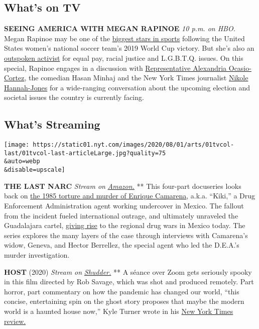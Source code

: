 \hypertarget{whats-on-tv}{%
\subsection{What's on TV}\label{whats-on-tv}}

\textbf{SEEING AMERICA WITH MEGAN RAPINOE} \emph{10 p.m. on HBO.} Megan
Rapinoe may be one of the
\href{https://www.nytimes.com/2019/12/18/sports/year-of-victory-advocacy.html}{biggest
stars in sports} following the United States women's national soccer
team's 2019 World Cup victory. But she's also an
\href{https://www.nytimes.com/interactive/2019/07/29/magazine/megan-rapinoe-sports-politics.html}{outspoken
activist} for equal pay, racial justice and L.G.B.T.Q. issues. On this
special, Rapinoe engages in a discussion with
\href{https://www.nytimes.com/2020/07/23/us/alexandria-ocasio-cortez-sexism-congress.html}{Representative
Alexandria Ocasio-Cortez}, the comedian Hasan Minhaj and the New York
Times journalist
\href{https://www.nytimes.com/by/nikole-hannah-jones}{Nikole
Hannah-Jones} for a wide-ranging conversation about the upcoming
election and societal issues the country is currently facing.

\hypertarget{whats-streaming}{%
\subsection{What's Streaming}\label{whats-streaming}}

\texttt{[image: https://static01.nyt.com/images/2020/08/01/arts/01tvcol-last/01tvcol-last-articleLarge.jpg?quality=75\\\&auto=webp\\\&disable=upscale]}

\textbf{THE LAST NARC} \emph{Stream on}
\href{https://www.amazon.com/The-Last-Narc-Season-1/dp/B0876N8XXZ}{\emph{Amazon.}}
** This four-part docuseries looks back on
\href{https://www.nytimes.com/1985/03/07/world/body-of-us-drug-agent-believed-found-in-mexico.html}{the
1985 torture and murder of Enrique Camarena}, a.k.a. ``Kiki,'' a Drug
Enforcement Administration agent working undercover in Mexico. The
fallout from the incident fueled international outrage, and ultimately
unraveled the Guadalajara cartel,
\href{https://www.latimes.com/world/mexico-americas/la-fg-mexico-gallardo-20170824-story.html}{giving
rise} to the regional drug wars in Mexico today. The series explores the
many layers of the case through interviews with Camarena's widow,
Geneva, and Hector Berrellez, the special agent who led the D.E.A.'s
murder investigation.

\textbf{HOST} (2020) \emph{Stream on}
\href{https://www.shudder.com/}{\emph{Shudder.}} ** A séance over Zoom
gets seriously spooky in this film directed by Rob Savage, which was
shot and produced remotely. Part horror, part commentary on how the
pandemic has changed our world, ``this concise, entertaining spin on the
ghost story proposes that maybe the modern world is a haunted house
now,'' Kyle Turner wrote in his
\href{https://www.nytimes.com/2020/07/30/movies/host-review.html}{New
York Times review.}

